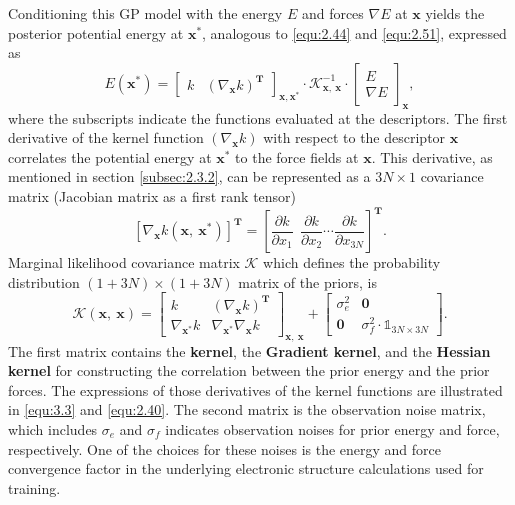 Conditioning this GP model with the energy $E$ and forces $\nabla E$ at $\mathbf{x}$ yields the posterior potential energy at $\mathbf{x}^{*}$, analogous to \eqref{equ:2.44} and \eqref{equ:2.51}, expressed as
\begin{equation} \label{equ:3.2}
        E(\mathbf{x}^{*}) = 
        \begin{bmatrix}
              k & (\nabla_{\mathbf{x}} k)^{\textbf{T}}
        \end{bmatrix}_{\textbf{x},\textbf{x}^{*}}
        \cdot \mathcal{K}^{-1}_{\mathbf{x},\: \mathbf{x}}
        \cdot
        \begin{bmatrix}
              E \\
              \nabla E
        \end{bmatrix}_{\mathbf{x}},
\end{equation}
where the subscripts indicate the functions evaluated at the descriptors.
The first derivative of the kernel function $(\nabla_{\mathbf{x}} k)$ with respect to the descriptor $\mathbf{x}$ correlates the potential energy at $\mathbf{x}^{*}$ to the force fields at $\mathbf{x}$.
This derivative, as mentioned in section \ref{subsec:2.3.2}, can be represented as a $3N\times1$ covariance matrix (Jacobian matrix as a first rank tensor)
\begin{equation} \label{equ:3.3}
    \left[\nabla_{\mathbf{x}}
    k(\mathbf{x},\:\mathbf{x}^{*})\right]^{\textbf{T}}
    = \left[\frac{\partial k}{\partial x_{1}}\ \ \frac{\partial k}{\partial x_{2}}\cdots\frac{\partial k}{\partial x_{3N}} \right]^{\textbf{T}}.
\end{equation}
Marginal likelihood covariance matrix $\mathcal{K}$ which defines the probability distribution $(1+3N)\times(1+3N)$ matrix of the priors, is 
\begin{equation} \label{equ:3.4}
\mathcal{K}(\mathbf{x},\: \mathbf{x}) = 
\begin{bmatrix}
             k & (\nabla_{\mathbf{x}} k)^{\textbf{T}}\\
             \nabla_{\mathbf{x}^{*}} k & \nabla_{\mathbf{x}^{*}}\nabla_{\mathbf{x}} k
\end{bmatrix}_{\mathbf{x},\: \mathbf{x}}
+
\begin{bmatrix}
             \sigma^{2}_{e} & \mathbf{0}\\
             \mathbf{0} & \sigma^{2}_{f}\cdot\mathbb{1}_{3N\times 3N}
\end{bmatrix}.
\end{equation}
The first matrix contains the \textbf{kernel}, the \textbf{Gradient kernel}, and the \textbf{Hessian kernel} for constructing the correlation between the prior energy and the prior forces.
The expressions of those derivatives of the kernel functions are illustrated in \eqref{equ:3.3} and \eqref{equ:2.40}.
The second matrix is the observation noise matrix, which includes $\sigma_{e}$ and $\sigma_{f}$ indicates observation noises for prior energy and force, respectively.
One of the choices for these noises is the energy and force convergence factor in the underlying electronic structure calculations used for training.

